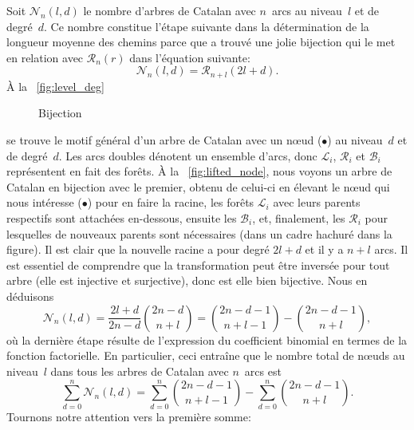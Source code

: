 Soit \(\mathcal{N}_n(l,d)\) le nombre d'arbres de Catalan avec
\(n\)~arcs au niveau~\(l\) et de degré~\(d\). Ce nombre constitue
l'étape suivante dans la détermination de la longueur moyenne des
chemins parce que \cite{Ruskey_1983} a trouvé une jolie bijection qui
le met en relation avec \(\mathcal{R}_n(r)\) dans l'équation suivante:
\begin{equation*}
\mathcal{N}_n(l,d) = \mathcal{R}_{n+l}(2l+d).
\end{equation*}
À la \fig~\ref{fig:level_deg}
\begin{figure}
\centering
{}
\quad
{}
\caption{Bijection}
\label{fig:bij_root_level}
\end{figure}
se trouve le motif général d'un arbre de Catalan avec un nœud
(\(\bullet\)) au niveau~\(d\) et de degré~\(d\). Les arcs doubles
dénotent un ensemble d'arcs, donc \(\mathcal{L}_i\), \(\mathcal{R}_i\)
et \(\mathcal{B}_i\) représentent en fait des forêts. À la
\fig~\ref{fig:lifted_node}, nous voyons un arbre de Catalan en
bijection avec le premier, obtenu de celui-ci en élevant le nœud
qui nous intéresse (\(\bullet\)) pour en faire la racine, les forêts
\(\mathcal{L}_i\) avec leurs parents respectifs sont attachées
en-dessous, ensuite les \(\mathcal{B}_i\), et, finalement, les
\(\mathcal{R}_i\) pour lesquelles de nouveaux parents sont nécessaires
(dans un cadre hachuré dans la figure). Il est clair que la nouvelle
racine a pour degré \(2l+d\) et il y a \(n+l\) arcs. Il est essentiel
de comprendre que la transformation peut être inversée pour tout arbre
(elle est injective et surjective), donc est elle bien bijective. Nous
en déduisons
\begin{equation*}
\mathcal{N}_n(l,d) = \frac{2l+d}{2n-d}\binom{2n-d}{n+l}
= \binom{2n-d-1}{n+l-1} - \binom{2n-d-1}{n+l},
\end{equation*}
où la dernière étape résulte de l'expression du coefficient binomial en termes de la fonction factorielle. En particulier, ceci entraîne que le nombre total de nœuds au niveau~\(l\) dans tous les arbres de Catalan avec \(n\)~arcs est
\begin{equation*}
\sum_{d=0}^{n}\mathcal{N}_n(l,d)
  = \sum_{d=0}^{n}\binom{2n-d-1}{n+l-1}
    - \sum_{d=0}^{n}\binom{2n-d-1}{n+l}.
\end{equation*}
Tournons notre attention vers la première somme:
